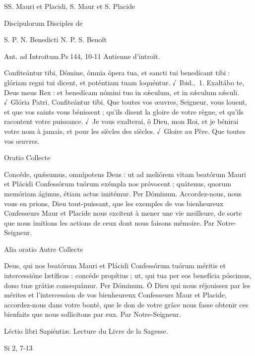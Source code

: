 \begin{paracol}{2}
SS. Mauri et Placidi,
\switchcolumn
S. Maur et S. Placide
\switchcolumn*

Discipulorum
\switchcolumn
Disciples de
\switchcolumn*

S. P. N. Benedicti
\switchcolumn
N. P. S. Benoît
\switchcolumn*

Ant. ad Introitum.\hfill Ps 144, 10-11
\switchcolumn
Antienne d’introït.
\switchcolumn*

Confiteántur tibi, Dómine, ómnia  ópera tua, et sancti tui benedícant tibi : glóriam regni tui dicent, et poténtiam tuam loquéntur. √~Ibid., 1. Exaltábo te, Deus meus Rex : et benedícam nómini tuo in sǽculum, et in sǽculum sǽculi. √~Glória Patri. Confiteántur tibi.
\switchcolumn
Que toutes vos œuvres, Seigneur, vous  louent, et que vos saints vous bénissent ; qu’ils disent la gloire de votre règne, et qu’ils racontent votre puissance. √~Je vous exalterai, ô Dieu, mon Roi, et je bénirai votre nom à jamais, et pour les siècles des siècles. √~Gloire au Père. Que toutes vos œuvres.
\switchcolumn*

Oratio
\switchcolumn
Collecte
\switchcolumn*

Concéde, quǽsumus, omnípotens  Deus : ut ad meliórem vitam beatórum Mauri et Plácidi Confessórum tuórum exémpla nos próvocent ; quátenus, quorum memóriam ágimus, étiam actus imitémur. Per Dóminum.
\switchcolumn
Accordez-nous, nous vous en prions,  Dieu tout-puissant, que les exemples de vos bienheureux Confesseurs Maur et Placide nous excitent à mener une vie meilleure, de sorte que nous imitions les actions de ceux dont nous faisons mémoire. Par Notre-Seigneur.
\switchcolumn*

Alia oratio
\switchcolumn
Autre Collecte
\switchcolumn*

Deus, qui nos beatórum Mauri et  Plácidi Confessórum tuórum méritis et intercessióne lætíficas : concéde propítius ; ut, qui tua per eos benefícia póscimus, dono tuæ grátiæ consequámur. Per Dóminum.
\switchcolumn
Ô Dieu qui nous réjouissez par les mérites et l’intercession de vos bienheureux Confesseurs Maur et Placide, accordez-nous dans votre bonté, que le don de votre grâce nous fasse obtenir ces bienfaits que nous sollicitons par eux. Par Notre-Seigneur.
\switchcolumn*

Léctio libri Sapiéntiæ.
\switchcolumn
Lecture du Livre de la Sagesse.
\switchcolumn*

Si 2, 7-13
\switchcolumn

\switchcolumn*


\end{paracol}
